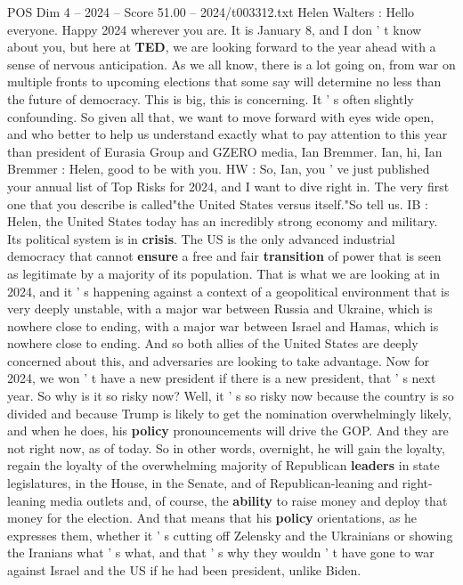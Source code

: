 \begin{textsample}{POS Dim 4 – 2024 – Score 51.00 – 2024/t003312.txt}  \label{ex:f4_pos_010}
Helen Walters : Hello everyone.
Happy 2024 wherever you are.
It is January 8, and I don ' t know about you, but here at \textbf{TED}, we are looking forward to the year ahead with a sense of nervous anticipation.
As we all know, there is a lot going on, from war on multiple fronts to upcoming elections that some say will determine no less than the future of democracy.
This is big, this is concerning.
It ' s often slightly confounding.
So given all that, we want to move forward with eyes wide open, and who better to help us understand exactly what to pay attention to this year than president of Eurasia Group and GZERO media, Ian Bremmer.
Ian, hi, Ian Bremmer : Helen, good to be with you.
HW : So, Ian, you ' ve just published your annual list of Top Risks for 2024, and I want to dive right in.
The very first one that you describe is called"the United States versus itself."So tell us.
IB : Helen, the United States today has an incredibly strong economy and military.
Its political system is in \textbf{crisis}.
The US is the only advanced industrial democracy that cannot \textbf{ensure} a free and fair \textbf{transition} of power that is seen as legitimate by a majority of its population.
That is what we are looking at in 2024, and it ' s happening against a context of a geopolitical environment that is very deeply unstable, with a major war between Russia and Ukraine, which is nowhere close to ending, with a major war between Israel and Hamas, which is nowhere close to ending.
And so both allies of the United States are deeply concerned about this, and adversaries are looking to take advantage.
Now for 2024, we won ' t have a new president if there is a new president, that ' s next year.
So why is it so risky now?
Well, it ' s so risky now because the country is so divided and because Trump is likely to get the nomination overwhelmingly likely, and when he does, his \textbf{policy} pronouncements will drive the GOP.
And they are not right now, as of today.
So in other words, overnight, he will gain the loyalty, regain the loyalty of the overwhelming majority of Republican \textbf{leaders} in state legislatures, in the House, in the Senate, and of Republican-leaning and right-leaning media outlets and, of course, the \textbf{ability} to raise money and deploy that money for the election.
And that means that his \textbf{policy} orientations, as he expresses them, whether it ' s cutting off Zelensky and the Ukrainians or showing the Iranians what ' s what, and that ' s why they wouldn ' t have gone to war against Israel and the US if he had been president, unlike Biden.

\end{textsample}
